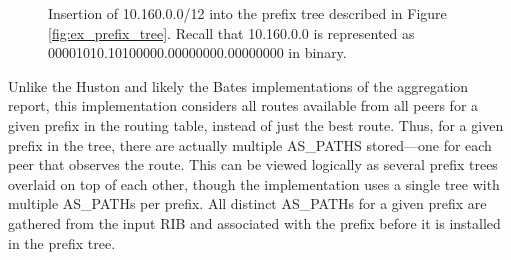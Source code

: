 \begin{figure}
    \caption[Insertion into the prefix tree]{Insertion of 10.160.0.0/12 into
    the prefix tree described in Figure \ref{fig:ex_prefix_tree}. Recall that
    10.160.0.0 is represented as 00001010.10100000.00000000.00000000 in
    binary.}
    \label{fig:ex_prefix_tree_insert}
\end{figure}

Unlike the Huston and likely the Bates implementations of the aggregation
report, this implementation considers all routes available from all peers for a
given prefix in the routing table, instead of just the best route. Thus, for a
given prefix in the tree, there are actually multiple AS\_PATHS stored---one
for each peer that observes the route. This can be viewed logically as several
prefix trees overlaid on top of each other, though the implementation uses
a single tree with multiple AS\_PATHs per prefix. All distinct AS\_PATHs
for a given prefix are gathered from the input RIB and associated with the
prefix before it is installed in the prefix tree.

